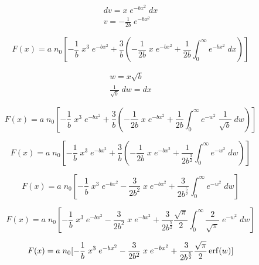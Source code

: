 \documentclass[11pt,a4paper]{article}
\begin{document}
\begin{equation}
    \begin{gathered}
        dv = x \; e^{-bx^2} \; dx\\
        v = -\frac{1}{2b} \; e^{-bx^2}
    \end{gathered}
\end{equation}

\begin{equation}
    F(x) = a \; n_0 [-\frac{1}{b} \; x^3 \; e^{-bx^2} + \frac{3}{b} (-\frac{1}{2b} \; x \; e^{-bx^2} + \frac{1}{2b} \int_0^{\infty} e^{-bx^2} \; dx)]
\end{equation}

\begin{equation*}
    \begin{gathered}
        w = x\sqrt{b}\\
        \frac{1}{\sqrt{b}} \; dw = dx
    \end{gathered}
\end{equation*}

\begin{equation}
    F(x) = a \; n_0 [-\frac{1}{b} \; x^3 \; e^{-bx^2} + \frac{3}{b} (-\frac{1}{2b} \; x \; e^{-bx^2} + \frac{1}{2b} \int_0^{\infty} e^{-w^2} \; \frac{1}{\sqrt{b}} \; dw)]
\end{equation}

\begin{equation}
    F(x) = a \; n_0 [-\frac{1}{b} \; x^3 \; e^{-bx^2} + \frac{3}{b} (-\frac{1}{2b} \; x \; e^{-bx^2} + \frac{1}{2b^{\frac{3}{2}}} \int_0^{\infty} e^{-w^2} \; dw)]
\end{equation}

\begin{equation}
    F(x) = a \; n_0 [-\frac{1}{b} \; x^3 \; e^{-bx^2} - \frac{3}{2b^2} \; x \; e^{-bx^2} + \frac{3}{2b^{\frac{5}{2}}} \int_0^{\infty} e^{-w^2} \; dw]
\end{equation}

\begin{equation}
    F(x) = a \; n_0 [-\frac{1}{b} \; x^3 \; e^{-bx^2} - \frac{3}{2b^2} \; x \; e^{-bx^2} + \frac{3}{2b^{\frac{5}{2}}} \frac{\sqrt{\pi}}{2} \int_0^{\infty} \frac{2}{\sqrt{\pi}} \; e^{-w^2} \; dw]
\end{equation}

\begin{equation}
    F(x) = a \; n_0 [-\frac{1}{b} \; x^3 \; e^{-bx^2} - \frac{3}{2b^2} \; x \; e^{-bx^2} + \frac{3}{2b^{\frac{5}{2}}} \frac{\sqrt{\pi}}{2} \erf(w)]
\end{equation}
\end{document}
